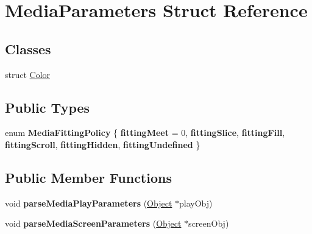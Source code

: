\hypertarget{struct_media_parameters}{}\section{Media\+Parameters Struct Reference}
\label{struct_media_parameters}
\subsection*{Classes}
\begin{DoxyCompactItemize}
\item 
struct \hyperlink{struct_media_parameters_1_1_color}{Color}
\end{DoxyCompactItemize}
\subsection*{Public Types}
\begin{DoxyCompactItemize}
\item 
\mbox{\label{struct_media_parameters_a88e7d81fd5384d7fa8de255c0836e332}} 
enum {\bfseries Media\+Fitting\+Policy} \{ \newline
{\bfseries fitting\+Meet} = 0, 
{\bfseries fitting\+Slice}, 
{\bfseries fitting\+Fill}, 
{\bfseries fitting\+Scroll}, 
\newline
{\bfseries fitting\+Hidden}, 
{\bfseries fitting\+Undefined}
 \}
\end{DoxyCompactItemize}
\subsection*{Public Member Functions}
\begin{DoxyCompactItemize}
\item 
\mbox{\label{struct_media_parameters_ad26daacebf406c85a53073ce223d495b}} 
void {\bfseries parse\+Media\+Play\+Parameters} (\hyperlink{class_object}{Object} $\ast$play\+Obj)
\item 
\mbox{\label{struct_media_parameters_a52a89e0dc058af6bdf8a6f034d37ce72}} 
void {\bfseries parse\+Media\+Screen\+Parameters} (\hyperlink{class_object}{Object} $\ast$screen\+Obj)
\end{DoxyCompactItemize}
